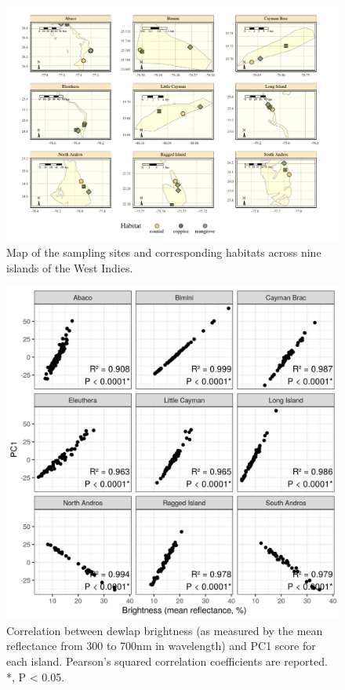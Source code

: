 \begin{figure}[H]
\centering
	\includegraphics[width=\textwidth]{../maps/detailed_map.pdf}
	\caption{Map of the sampling sites and corresponding habitats across nine islands of the West Indies.}
	\label{supfig:map}
\end{figure}

\begin{figure}
	\centering
	\includegraphics{"../analyses/03-PCA/figure_brightness"}
	\caption{Correlation between dewlap brightness (as measured by the mean reflectance from 300 to 700nm in wavelength) and PC1 score for each island. Pearson's squared correlation coefficients are reported. *, P < 0.05.}	
	\label{supfig:brightness}
\end{figure}

